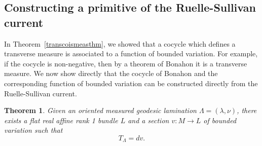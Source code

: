 \documentclass{ip-journal}
\newtheorem{theorem}{Theorem}[section]
\theoremstyle{definition}
\numberwithin{equation}{section}
\begin{document}
 




\subsection{Constructing a primitive of the Ruelle-Sullivan current} 
In Theorem~\ref{transcoismeasthm}, we showed that a cocycle which defines a transverse measure is associated to a function of bounded variation.  For example, if the cocycle is non-negative, then by a theorem of Bonahon it is a transverse measure.  We now show directly that the cocycle of Bonahon and the corresponding function of bounded variation can be constructed directly from the Ruelle-Sullivan current.

\begin{theorem}\label{conversetomeasure} Given an oriented measured geodesic  lamination $\Lambda=(\lambda, \nu)$, there exists a flat real affine rank 1 bundle  $L$ and a section $v: M \rightarrow L$ of bounded variation  such that
\begin{equation}\label{T=dv}
T_\Lambda=dv.
\end{equation}
\end{theorem}
\end{document}
